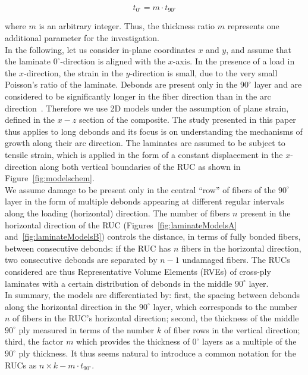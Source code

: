 \documentclass[Review,sagev,times]{sagej}
\begin{document}
\begin{equation}\label{eq:t90}
t_{0^{\circ}}=m\cdot t_{90^{\circ}}
\end{equation}

where $m$ is an arbitrary integer. Thus, the thickness ratio $m$ represents one additional parameter for the investigation.\\
In the following, let us consider in-plane coordinates $x$ and $y$, and assume that the laminate $0^{\circ}$-direction is aligned with the $x$-axis. In the presence of a load in the $x$-direction, the strain in the $y$-direction is small, due to the very small Poisson's ratio of the laminate. Debonds are present only in the $90^{\circ}$ layer and are considered to be significantly longer in the fiber direction than in the arc direction~\cite{Zhang1997}. Therefore we use 2D models under the assumption of plane strain, defined in the $x-z$ section of the composite. The study presented in this paper thus applies to long debonds and its focus is on understanding the mechanisms of growth along their arc direction. The laminates are assumed to be subject to tensile strain, which is applied in the form of a constant displacement in the $x$-direction along both vertical boundaries of the RUC as shown in  Figure~\ref{fig:modelschem}.\\
We assume damage to be present only in the central ``row'' of fibers of the $90^{\circ}$ layer in the form of multiple debonds appearing at different regular intervals along the loading (horizontal) direction. The number of fibers $n$ present in the horizontal direction of the RUC (Figures~\ref{fig:laminateModelsA} and~\ref{fig:laminateModelsB}) controls the distance, in terms of fully bonded fibers, between consecutive debonds: if the RUC has $n$ fibers in the horizontal direction, two consecutive debonds are separated by $n-1$ undamaged fibers. The RUCs considered are thus Representative Volume Elements (RVEs) of cross-ply laminates with a certain distribution of debonds in the middle $90^{\circ}$ layer.\\
In summary, the models are differentiated by: first, the spacing between debonds along the horizontal direction in the $90^{\circ}$ layer, which corresponds to the number $n$ of fibers in the RUC's horizontal direction; second, the thickness of the middle $90^{\circ}$ ply measured in terms of the number $k$ of fiber rows in the vertical direction; third, the factor $m$ which provides the thickness of $0^{\circ}$ layers as a multiple of the $90^{\circ}$ ply thickness. It thus seems natural to introduce a common notation for the RUCs as $n\times k-m\cdot t_{90^{\circ}}$.\\
\end{document}

